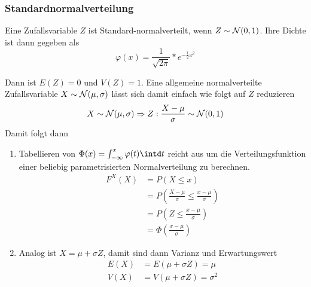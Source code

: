 \subsubsection{Standardnormalverteilung}
Eine Zufallsvariable $Z$ ist Standard-normalverteilt, wenn $Z\sim\mathcal{N}(0,1)$.
Ihre Dichte ist dann gegeben als
\begin{equation*}
	\varphi(x)=\frac{1}{\sqrt{2\pi}}*e^{-\frac12x^2}
\end{equation*}

Dann ist $E(Z)=0$ und $V(Z)=1$. Eine allgemeine normalverteilte Zufallsvariable $X\sim\mathcal{N}(\mu,\sigma)$ lässt sich damit einfach wie folgt auf $Z$ reduzieren
\begin{equation*}
	X\sim\mathcal{N}(\mu, \sigma)\Rightarrow Z:\frac{X-\mu}{\sigma}\sim\mathcal{N}(0,1)
\end{equation*}
Damit folgt dann
\begin{enumerate}
	\item Tabellieren von $\Phi(x)=\int_{-\infty}^x \varphi(t)\intd t$ reicht aus um die Verteilungsfunktion einer beliebig parametrisierten Normalverteilung zu berechnen.
	\begin{align*}
		F^X(X)&=P(X\leq x)\\
		&=P\left(\frac{X-\mu}{\sigma}\leq \frac{x-\mu}{\sigma}\right)\\
		&=P\left(Z\leq\frac{x-\mu}{\sigma}\right)\\
		&=\Phi\left(\frac{x-\mu}{\sigma}\right)
	\end{align*}
	\item Analog ist $X=\mu+\sigma Z$, damit sind dann Varianz und Erwartungswert
	\begin{align*}
		E(X)&=E(\mu+\sigma Z)=\mu\\
		V(X)&=V(\mu+\sigma Z)=\sigma^2
	\end{align*}
\end{enumerate}



